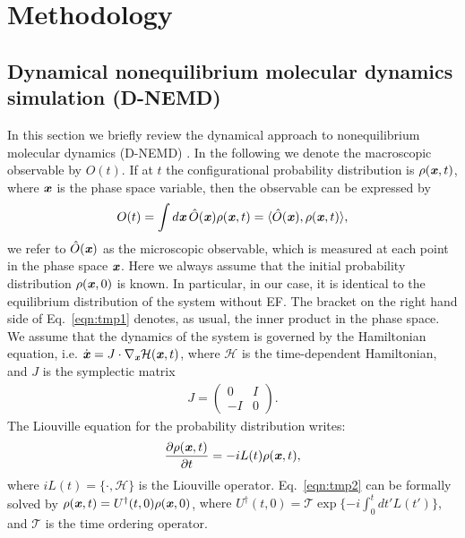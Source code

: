 \documentclass[journal=jctcce,manuscript=manuscript]{achemso}
\newcommand{\vect}[1]{\textbf{\textit{#1}}}
\begin{document}
\section{Methodology}
\subsection{Dynamical nonequilibrium molecular dynamics simulation (D-NEMD)}
In this section we briefly review the dynamical approach to nonequilibrium
molecular dynamics (D-NEMD) \cite{ciccotti1975direct, ciccotti1979thought,
  orlandini2011hydrodynamics, orlandini2011hydrodynamics-01}.
In the following we denote the macroscopic observable by $O(t)$. If at $t$
the configurational probability distribution is $\rho(\vect x, t)$, where
$\vect x$ is the phase space variable, then the observable can be
expressed by
\begin{align}\label{eqn:tmp1}
  O(t) = \int d\vect x\, \hat O(\vect x)\rho(\vect x, t)  = \langle \hat O(\vect x), \rho(\vect x, t)\rangle,
\end{align}
we refer to $\hat O (\vect x)$ as the microscopic observable, 
which is measured at each point in the phase space $\vect x$.
Here we always assume that the initial probability distribution
$\rho(\vect x, 0)$ is known. In particular, in our case,
it is identical to the equilibrium distribution of the system
without EF.
The bracket on the right hand side of Eq.~\eqref{eqn:tmp1} denotes, as usual, the inner product in the
phase space.  We assume that the dynamics of the system is governed by the
Hamiltonian equation, i.e. $\dot {\vect x} = J \cdot \nabla_{\vect x}
\mathcal H(\vect x, t)$, where $\mathcal H$ is the time-dependent Hamiltonian,
and $J$ is
the symplectic matrix
\begin{align}
  J = \left(
    \begin{array}{rr}
      0 & I\\
      -I & 0
    \end{array}
    \right).
\end{align}
The Liouville equation for the probability
distribution writes:
\begin{align}\label{eqn:tmp2}
  \frac{\partial \rho(\vect x, t)}{\partial t} = - iL(t) \rho(\vect x, t),
\end{align}
where $iL(t) = \{\cdot, \mathcal H\}$ is the Liouville operator.
Eq.~\eqref{eqn:tmp2}
can be formally solved by $\rho(\vect x, t) = U^\dagger(t,0) \rho(\vect x, 0)$,
{where $U^\dagger(t,0) = \mathcal T\exp\{-i \int_0^t d t' L(t')\}$, and $\mathcal T$ is the time ordering operator.}
\end{document}
